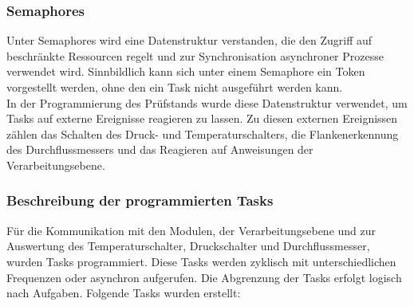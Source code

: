 \subsubsection{Semaphores}
Unter Semaphores wird eine Datenstruktur verstanden, die den Zugriff auf beschränkte Ressourcen regelt und zur Synchronisation asynchroner Prozesse verwendet wird. Sinnbildlich kann sich unter einem Semaphore ein Token vorgestellt werden, ohne den ein Task nicht ausgeführt werden kann.
\\
In der Programmierung des Prüfstands wurde diese Datenstruktur verwendet, um Tasks auf externe Ereignisse reagieren zu lassen. Zu diesen externen Ereignissen zählen das Schalten des Druck- und Temperaturschalters, die Flankenerkennung des Durchflussmessers und das Reagieren auf Anweisungen der Verarbeitungsebene.
\cite[][S. 191ff]{FRTOSManual}

\subsubsection{Beschreibung der programmierten Tasks}
Für die Kommunikation mit den Modulen, der Verarbeitungsebene und zur Auswertung des Temperaturschalter, Druckschalter und Durchflussmesser, wurden Tasks programmiert. Diese Tasks werden zyklisch mit unterschiedlichen Frequenzen oder asynchron aufgerufen. Die Abgrenzung der Tasks erfolgt logisch nach Aufgaben. Folgende Tasks wurden erstellt:

